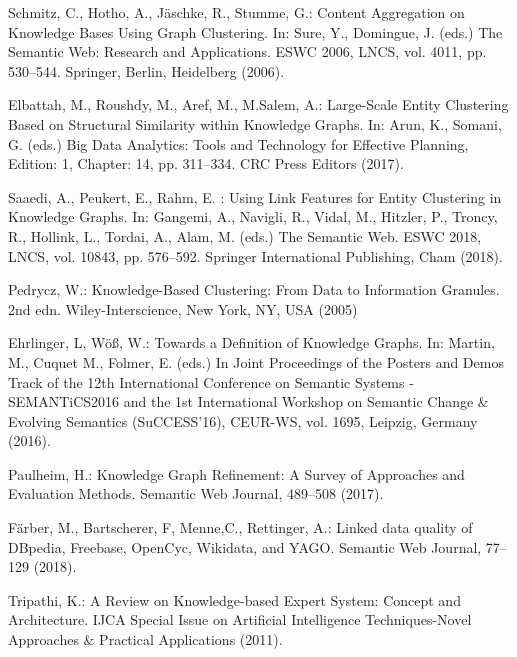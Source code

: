 \documentclass[runningheads]{llncs}
\begin{document}
%
%
%


%
\begin{thebibliography}{8}
Schmitz, C., Hotho, A., J{\"a}schke, R., Stumme, G.: Content Aggregation on Knowledge Bases Using Graph Clustering. In: Sure, Y., Domingue, J. (eds.) The Semantic Web: Research and Applications. ESWC 2006, LNCS, vol. 4011, pp. 530--544.
Springer, Berlin, Heidelberg (2006). 

Elbattah, M., Roushdy, M., Aref, M., M.Salem, A.: Large-Scale Entity Clustering Based on Structural Similarity within Knowledge Graphs. In: Arun, K., Somani, G. (eds.) Big Data Analytics: Tools and Technology for Effective Planning, Edition: 1, Chapter: 14, pp. 311--334. CRC Press Editors (2017). 

Saaedi, A., Peukert, E., Rahm, E.  : Using Link Features for Entity Clustering in Knowledge Graphs. In: Gangemi, A., Navigli, R., Vidal, M., Hitzler, P., Troncy, R., Hollink, L., Tordai, A., Alam, M. (eds.) The Semantic Web. ESWC 2018, LNCS, vol. 10843, pp. 576--592.
Springer International Publishing, Cham (2018). 

Pedrycz, W.: Knowledge-Based Clustering: From Data to Information Granules. 2nd edn. Wiley-Interscience, New York, NY, USA (2005)

Ehrlinger, L, W{\"o}{\ss}, W.: Towards a Definition of Knowledge Graphs. In: Martin, M., Cuquet M., Folmer, E. (eds.) In Joint Proceedings of the Posters and Demos Track of the 12th International Conference on Semantic Systems - SEMANTiCS2016 and the 1st International Workshop on Semantic Change \& Evolving Semantics (SuCCESS'16), CEUR-WS, vol. 1695, Leipzig, Germany (2016). 

Paulheim, H.: Knowledge Graph Refinement: A Survey of Approaches and Evaluation Methods. Semantic Web Journal, 489--508 (2017). 

F{\"a}rber, M., Bartscherer, F, Menne,C., Rettinger, A.: Linked data quality of DBpedia, Freebase, OpenCyc, Wikidata, and YAGO. Semantic Web Journal, 77--129 (2018). 

Tripathi, K.: A Review on Knowledge-based Expert System: Concept and Architecture. IJCA Special Issue on Artificial Intelligence Techniques-Novel Approaches \& Practical Applications (2011). 


\end{thebibliography}
\end{document}
